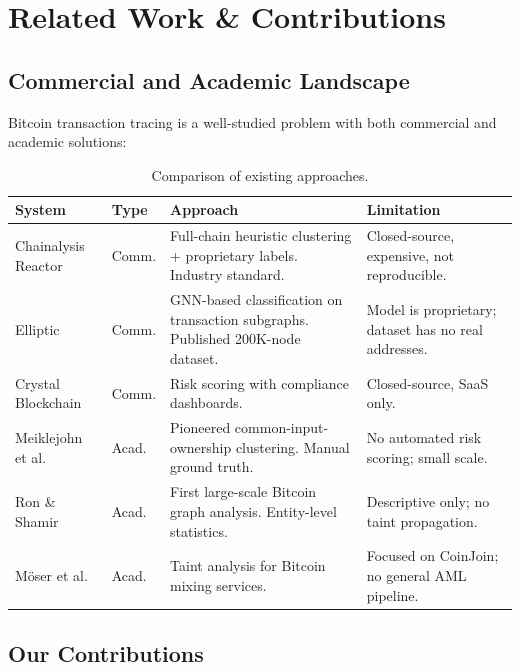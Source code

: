 \documentclass[a4paper,11pt]{article}
\begin{document}
\section{Related Work \& Contributions}

\subsection{Commercial and Academic Landscape}

Bitcoin transaction tracing is a well-studied problem with both commercial and academic solutions:

\begin{table}[H]
\centering
\small
\caption{Comparison of existing approaches.}
\begin{tabularx}{\textwidth}{@{}p{3.2cm}lXX@{}}
\toprule
\textbf{System} & \textbf{Type} & \textbf{Approach} & \textbf{Limitation} \\
\midrule
Chainalysis Reactor & Comm. & Full-chain heuristic clustering + proprietary labels. Industry standard. & Closed-source, expensive, not reproducible. \\
Elliptic & Comm. & GNN-based classification on transaction subgraphs. Published 200K-node dataset. & Model is proprietary; dataset has no real addresses. \\
Crystal Blockchain & Comm. & Risk scoring with compliance dashboards. & Closed-source, SaaS only. \\
Meiklejohn et al.~\cite{meiklejohn2013} & Acad. & Pioneered common-input-ownership clustering. Manual ground truth. & No automated risk scoring; small scale. \\
Ron \& Shamir~\cite{ron2013} & Acad. & First large-scale Bitcoin graph analysis. Entity-level statistics. & Descriptive only; no taint propagation. \\
M\"{o}ser et al.~\cite{moeser2013} & Acad. & Taint analysis for Bitcoin mixing services. & Focused on CoinJoin; no general AML pipeline. \\
\bottomrule
\end{tabularx}
\end{table}

\subsection{Our Contributions}
\end{document}
